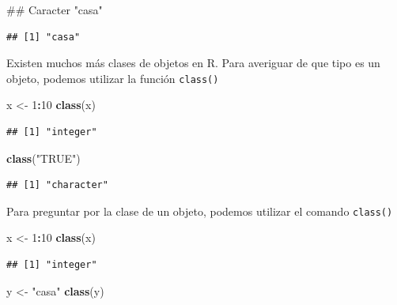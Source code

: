 \documentclass[spanish,]{book}
\newenvironment{Shaded}{\begin{snugshade}}{\end{snugshade}}
\newcommand{\KeywordTok}[1]{\textcolor[rgb]{0.13,0.29,0.53}{\textbf{#1}}}
\newcommand{\DecValTok}[1]{\textcolor[rgb]{0.00,0.00,0.81}{#1}}
\newcommand{\StringTok}[1]{\textcolor[rgb]{0.31,0.60,0.02}{#1}}
\newcommand{\OperatorTok}[1]{\textcolor[rgb]{0.81,0.36,0.00}{\textbf{#1}}}
\newcommand{\NormalTok}[1]{#1}
\begin{document}
\begin{Shaded}
\begin{Highlighting}[]
\NormalTok{## Caracter}
\StringTok{"casa"}
\end{Highlighting}
\end{Shaded}

\begin{verbatim}
## [1] "casa"
\end{verbatim}

Existen muchos más clases de objetos en R. Para averiguar de que tipo es
un objeto, podemos utilizar la función \texttt{class()}

\begin{Shaded}
\begin{Highlighting}[]
\NormalTok{x <-}\StringTok{ }\DecValTok{1}\OperatorTok{:}\DecValTok{10}
\KeywordTok{class}\NormalTok{(x)}
\end{Highlighting}
\end{Shaded}

\begin{verbatim}
## [1] "integer"
\end{verbatim}

\begin{Shaded}
\begin{Highlighting}[]
\KeywordTok{class}\NormalTok{(}\StringTok{"TRUE"}\NormalTok{)}
\end{Highlighting}
\end{Shaded}

\begin{verbatim}
## [1] "character"
\end{verbatim}

Para preguntar por la clase de un objeto, podemos utilizar el comando
\texttt{class()}

\begin{Shaded}
\begin{Highlighting}[]
\NormalTok{x <-}\StringTok{ }\DecValTok{1}\OperatorTok{:}\DecValTok{10}
\KeywordTok{class}\NormalTok{(x)}
\end{Highlighting}
\end{Shaded}

\begin{verbatim}
## [1] "integer"
\end{verbatim}

\begin{Shaded}
\begin{Highlighting}[]
\NormalTok{y <-}\StringTok{ "casa"}
\KeywordTok{class}\NormalTok{(y)}
\end{Highlighting}
\end{Shaded}
\end{document}
